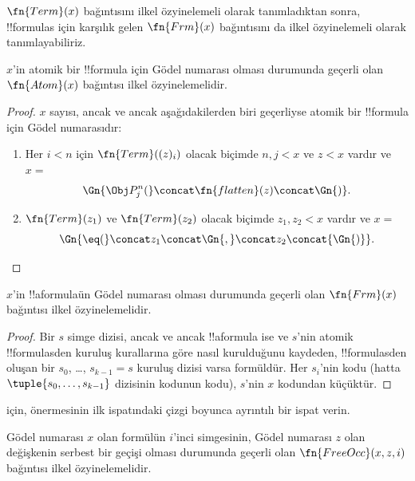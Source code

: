 \documentclass[../../../include/open-logic-section]{subfiles}
\begin{document}

$\fn{Term}(x)$ bağıntısını ilkel özyinelemeli olarak tanımladıktan sonra,
!!{formula}s için karşılık gelen $\fn{Frm}(x)$ bağıntısını da ilkel
özyinelemeli olarak tanımlayabiliriz.

\begin{prop}
$x$'in atomik bir !!{formula} için Gödel numarası olması durumunda geçerli olan
$\fn{Atom}(x)$ bağıntısı ilkel özyinelemelidir.
\end{prop}

\begin{proof}
$x$ sayısı, ancak ve ancak aşağıdakilerden biri geçerliyse atomik bir
!!{formula} için Gödel numarasıdır:
\begin{enumerate}
\item Her $i<n$ için $\fn{Term}((z)_i)$ olacak biçimde $n,j<x$ ve $z<x$
  vardır ve $x=$
\[
\Gn{\Obj P^n_j(} \concat \fn{flatten}(z) \concat \Gn{)}.
\]
\item $\fn{Term}(z_1)$ ve $\fn{Term}(z_2)$ olacak biçimde $z_1,z_2<x$
  vardır ve $x=$
\[
\Gn{{\eq}(} \concat z_1 \concat \Gn{,} \concat z_2 \concat{\Gn{)}}.
\]
\end{enumerate}
\end{proof}

\begin{prop}
$x$'in !!a{formula}{}ün Gödel numarası olması durumunda geçerli olan
$\fn{Frm}(x)$ bağıntısı ilkel özyinelemelidir.
\end{prop}

\begin{proof}
Bir $s$ simge dizisi, ancak ve ancak !!a{formula} ise ve $s$'nin atomik
!!{formula}s{}den kuruluş kurallarına göre nasıl kurulduğunu kaydeden,
!!{formula}s{}den oluşan bir $s_0$, \dots, $s_{k-1}=s$ kuruluş dizisi varsa
formüldür. Her $s_i$'nin
kodu (hatta $\tuple{s_0,\dots,s_{k-1}}$ dizisinin kodunun kodu), $s$'nin
$x$ kodundan küçüktür.
\end{proof}

\begin{prob}
 için,
 önermesinin ilk ispatındaki çizgi
boyunca ayrıntılı bir ispat
verin.
\end{prob}

\begin{prop}
Gödel numarası $x$ olan formülün $i$'inci simgesinin, Gödel numarası $z$
olan değişkenin serbest bir geçişi olması durumunda geçerli olan
$\fn{FreeOcc}(x,z,i)$ bağıntısı ilkel özyinelemelidir.
\end{prop}
\end{document}
